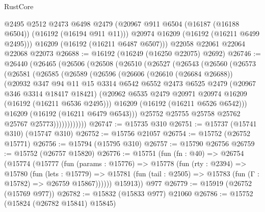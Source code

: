 \begin{lexlean}{RustCore}
\begin{coremodule}
        @2495
        @2512
        @2473
        @6498
        @2479
        (@20967 @911 @6504 (@16187 (@16188 @6504)) (@16192 (@16194 @911 @11)))
        @20974
        @16209
        (@16192 (@16211 @6499 @2495)))
      @16209
      (@16192 (@16211 @6487 @6507)))
    @22058
    @22061
    @22064
    @22068
    @22073
@26688 := @16192 (@16249 (@16250 @22075) @2692)
@26746 := @26440
    (@26465
      (@26506
        (@26508
          (@26510
            (@26527
              (@26543
                (@26560
                  (@26573
                    (@26581
                      (@26585
                        (@26589
                          (@26596
                            (@26606
                              (@26610 (@26684 @26688))
                              (@20932
                                @347
                                @94
                                @11
                                @15
                                @3314
                                @6542
                                @6552
                                @2473
                                @6525
                                @2479
                                (@20967 @346 @3314 @18417 @18421)
                                (@20962
                                  @6535
                                  @2479
                                  @20971
                                  @20974
                                  @16209
                                  (@16192 (@16211 @6536 @2495)))
                                @16209
                                (@16192 (@16211 @6526 @6542)))
                              @16209
                              (@16192 (@16211 @6479 @6543)))
                            @25752
                            @25755
                            @25758
                            @25762
                            @25767
                            @25773))))))))))))
@26747 := @15735 @310
@26751 := @15737 (@15741 @310) (@15747 @310)
@26752 := @15756 @21057
@26754 := @15752 (@26752 @15771)
@26756 := @15794 (@15795 @310)
@26757 := @15790 @26756
@26759 := @15752 (@26757 @15820)
@26776 := @15751
    (fun (fn : @40) =>
    @26754
      (@15774
        (@15777
          (fun (params : @15776) =>
          @15778
            (fun (rty : @2394) =>
            @15780
              (fun (lets : @15779) =>
              @15781 (fun (tail : @2505) => @15783 (fun (Γ : @15782) => @26759 @15867))))))
        @15913))
    @977
@26779 := @15919 (@26752 (@15769 @977))
@26782 := @15832 (@15833 @977) @21060
@26786 := @15752 (@15824 (@26782 @15841) @15845)

\end{coremodule}
\end{lexlean}
